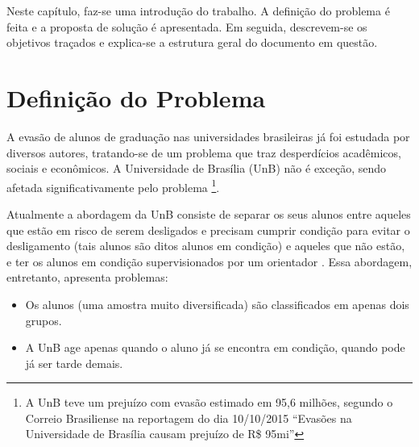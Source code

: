 Neste capítulo, faz-se uma introdução do trabalho. A definição do problema é feita e
a proposta de solução é apresentada. Em seguida, descrevem-se os objetivos traçados e
explica-se a estrutura geral do documento em questão. 

\section{Definição do Problema}
A evasão de alunos de graduação nas universidades brasileiras já foi estudada por
diversos autores, tratando-se de um problema que traz desperdícios acadêmicos,
sociais e econômicos.
A Universidade de Brasília (UnB) não é exceção, sendo afetada
significativamente pelo problema \footnote{A UnB teve um prejuízo com evasão estimado
em 95,6 milhões, segundo o Correio Brasiliense na reportagem do dia 10/10/2015 ``Evasões na
Universidade de Brasília causam prejuízo de R\$ 95mi''\cite{correio}}.

\par Atualmente a abordagem da UnB consiste de separar os seus alunos entre aqueles
que estão em risco de serem desligados e precisam cumprir condição para evitar o
desligamento (tais alunos são
ditos alunos em condição) e aqueles que não estão, e ter os alunos em condição
supervisionados por um orientador \cite{manual_calouro}. 
Essa abordagem, entretanto, apresenta problemas:
    \begin{itemize}
        \item Os alunos (uma amostra muito diversificada) são classificados em apenas
    dois grupos.
        \item A UnB age apenas quando o aluno já se encontra em condição, quando pode
    já ser tarde demais.
    \end{itemize}

